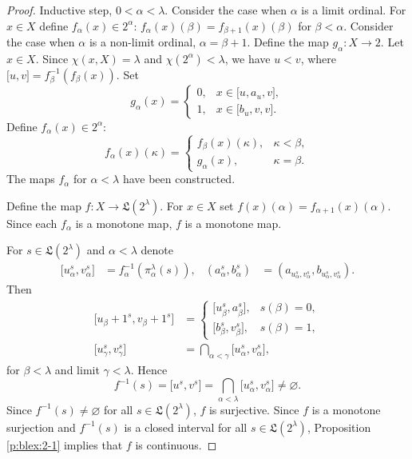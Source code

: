 \documentclass[10pt,a4paper]{amsart}
\def\B{2}
\def\al{\alpha}
\def\be{\beta}
\def\es{\varnothing}
\def\ga{\gamma}
\def\ilcc[#1,#2]{\ilsymlc#1\ilcomma/ #2\ilsymrc}
\def\ilcomma/{\boldsymbol{,}}
\def\ilsymlc{\boldsymbol{[}}
\def\ilsymrc{\boldsymbol{]}}
\def\ka{\kappa}
\def\la{\lambda}
\def\lex#1#2{\mathfrak{L}(#2^{#1})}
\def\lexab{\lex\la\B}
\begin{document}
\begin{proof}
Inductive step, $0<\al<\la$. Consider the case when $\al$ is a limit ordinal. For $x\in X$ define $f_\al(x)\in \B^\al$: $f_\al(x)(\be)=f_{\be+1}(x)(\be)$ for $\be<\al$. Consider the case when $\al$ is a non-limit ordinal, $\al=\be+1$.
Define the map $g_\al: X\to \B$. Let $x\in X$. Since $\chi(x,X)=\la$ and $\chi(\B^\al)<\la$, we have $u<v$, where $\ilcc[u,v]=f^{-1}_\be(f_\be(x))$. Set
\[
g_\al(x) = \begin{cases}
0,&	x\in \ilcc[u,a_{u,v}],
\\
1,&	x\in \ilcc[b_{u,v},v].
\end{cases}
\]
Define $f_\al(x)\in \B^\al$:
\[
f_\al(x)(\ka) = \begin{cases}
f_\be(x)(\ka),&	\ka<\be,
\\
g_\al(x),&	\ka=\be.
\end{cases}
\]
The maps $f_\al$ for $\al<\la$ have been constructed.

Define the map $f: X\to \lexab$. For $x\in X$ set $f(x)(\al)=f_{\al+1}(x)(\al)$.
Since each $f_\al$ is a monotone map, $f$ is a monotone map.

For $s\in \lexab$ and $\al<\la$ denote 
\begin{align*}
\ilcc[u_\al^s,v_\al^s]&=f^{-1}_\al(\pi_\al^\la(s)), 
&
(a_\al^s,b_\al^s)&=(a_{u_\al^s,v_\al^s},b_{u_\al^s,v_\al^s}).
\end{align*}
Then
\begin{align*}
\ilcc[u_{\be+1}^s,v_{\be+1}^s] &=
\begin{cases}
\ilcc[u_{\be}^s,a_{\be}^s], &  s(\be)=0,
\\
\ilcc[b_{\be}^s,v_{\be}^s], &  s(\be)=1,
\end{cases}
\\
\ilcc[u_{\ga}^s,v_{\ga}^s] &= \bigcap_{\al<\ga}\ilcc[u_\al^s,v_\al^s],
\end{align*}
for $\be<\la$ and limit $\ga<\la$. Hence 
\[
f^{-1}(s) = \ilcc[u^s,v^s]=\bigcap_{\al<\la}\ilcc[u_\al^s,v_\al^s]\neq\es.
\]
Since $f^{-1}(s)\neq\es$ for all $s\in\lexab$, $f$ is surjective.
Since $f$ is a monotone surjection and $f^{-1}(s)$ is a closed interval for all $s\in\lexab$, Proposition \ref{p:blex:2-1} implies that $f$ is continuous.


\end{proof}
\end{document}
